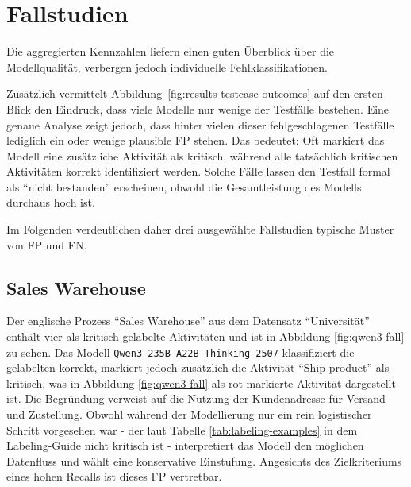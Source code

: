 \section{Fallstudien}\label{sec:fallstudien}

Die aggregierten Kennzahlen liefern einen guten Überblick über die Modellqualität, verbergen jedoch individuelle Fehlklassifikationen.

Zusätzlich vermittelt Abbildung~\ref{fig:results-testcase-outcomes} auf den ersten Blick den Eindruck, dass viele Modelle nur wenige der Testfälle bestehen. Eine genaue Analyse zeigt jedoch, dass hinter vielen dieser fehlgeschlagenen Testfälle lediglich ein oder wenige plausible \ac{FP} stehen. Das bedeutet: Oft markiert das Modell eine zusätzliche Aktivität als kritisch, während alle tatsächlich kritischen Aktivitäten korrekt identifiziert werden. Solche Fälle lassen den Testfall formal als \enquote{nicht bestanden} erscheinen, obwohl die Gesamtleistung des Modells durchaus hoch ist.

Im Folgenden verdeutlichen daher drei ausgewählte Fallstudien typische Muster von \ac{FP} und \ac{FN}.

\subsection*{Sales Warehouse}

Der englische Prozess \enquote{Sales Warehouse} aus dem Datensatz \enquote{Universität} enthält vier als kritisch gelabelte Aktivitäten und ist in Abbildung \ref{fig:qwen3-fall} zu sehen. Das Modell \texttt{Qwen3-235B-A22B-Thinking-2507} klassifiziert die gelabelten korrekt, markiert jedoch zusätzlich die Aktivität \enquote{Ship product} als kritisch, was in Abbildung \ref{fig:qwen3-fall} als rot markierte Aktivität dargestellt ist. Die Begründung verweist auf die Nutzung der Kundenadresse für Versand und Zustellung. Obwohl während der Modellierung nur ein rein logistischer Schritt vorgesehen war - der laut Tabelle \ref{tab:labeling-examples} in dem Labeling-Guide nicht kritisch ist - interpretiert das Modell den möglichen Datenfluss und wählt eine konservative Einstufung. Angesichts des Zielkriteriums eines hohen Recalls ist dieses \ac{FP} vertretbar.

